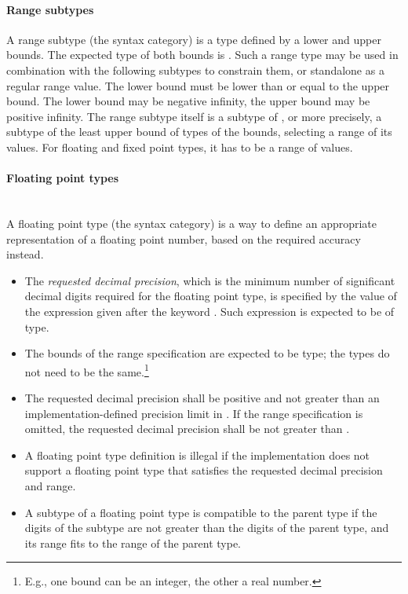 \paragraph{Range subtypes}
A range subtype (the  syntax category) is a type defined by a lower and upper bounds. The expected type of both bounds is . Such a range type may be used in combination with the following subtypes to constrain them, or standalone as a regular range value. The lower bound must be lower than or equal to the upper bound. The lower bound may be negative infinity, the upper bound may be positive infinity. The range subtype itself is a subtype of , or more precisely, a subtype of the least upper bound of types of the bounds, selecting a range of its values. For floating and fixed point types, it has to be a range of  values. 

\paragraph{Floating point types} ~\\
A floating point type (the  syntax category) is a way to define an appropriate representation of a floating point number, based on the required accuracy instead. 
\begin{itemize}
  \item[] The {\em requested decimal precision}, which is the minimum number of significant decimal digits required for the floating point type, is specified by the value of the expression given after the keyword . Such expression is expected to be of  type. 
  \item[] The bounds of the range specification are expected to be  type; the types do not need to be the same.\footnote{E.g., one bound can be an integer, the other a real number.}
  \item[] The requested decimal precision shall be positive and not greater than an implementation-defined precision limit in . If the range specification is omitted, the requested decimal precision shall be not greater than . 
  \item[] A floating point type definition is illegal if the implementation does not support a floating point type that satisfies the requested decimal precision and range. 
  \item[] A subtype of a floating point type is compatible to the parent type if the digits of the subtype are not greater than the digits of the parent type, and its range fits to the range of the parent type. 
\end{itemize}

